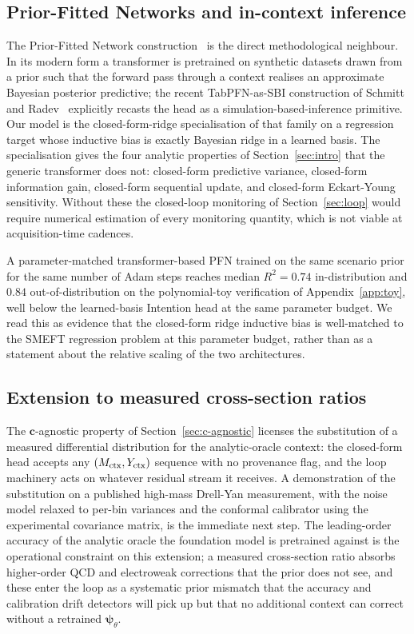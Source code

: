\documentclass[11pt,a4paper]{article}
\newcommand{\psib}{\bm{\psi}}
\begin{document}
\subsection{Prior-Fitted Networks and in-context inference}

The Prior-Fitted Network construction~\cite{Mueller:2022pfn,Schmitt:2025tabpfnsbi} is the direct methodological neighbour. In its modern form a transformer is pretrained on synthetic datasets drawn from a prior such that the forward pass through a context realises an approximate Bayesian posterior predictive; the recent TabPFN-as-SBI construction of Schmitt and Radev~\cite{Schmitt:2025tabpfnsbi} explicitly recasts the head as a simulation-based-inference primitive. Our model is the closed-form-ridge specialisation of that family on a regression target whose inductive bias is exactly Bayesian ridge in a learned basis. The specialisation gives the four analytic properties of Section~\ref{sec:intro} that the generic transformer does not: closed-form predictive variance, closed-form information gain, closed-form sequential update, and closed-form Eckart-Young sensitivity. Without these the closed-loop monitoring of Section~\ref{sec:loop} would require numerical estimation of every monitoring quantity, which is not viable at acquisition-time cadences.

A parameter-matched transformer-based PFN trained on the same scenario prior for the same number of Adam steps reaches median $R^2 = 0.74$ in-distribution and $0.84$ out-of-distribution on the polynomial-toy verification of Appendix~\ref{app:toy}, well below the learned-basis Intention head at the same parameter budget. We read this as evidence that the closed-form ridge inductive bias is well-matched to the SMEFT regression problem at this parameter budget, rather than as a statement about the relative scaling of the two architectures.

\subsection{Extension to measured cross-section ratios}
\label{sec:measured}

The $\bm{c}$-agnostic property of Section~\ref{sec:c-agnostic} licenses the substitution of a measured differential distribution for the analytic-oracle context: the closed-form head accepts any $(M_{\rm ctx}, Y_{\rm ctx})$ sequence with no provenance flag, and the loop machinery acts on whatever residual stream it receives. A demonstration of the substitution on a published high-mass Drell-Yan measurement, with the noise model relaxed to per-bin variances and the conformal calibrator using the experimental covariance matrix, is the immediate next step. The leading-order accuracy of the analytic oracle the foundation model is pretrained against is the operational constraint on this extension; a measured cross-section ratio absorbs higher-order QCD and electroweak corrections that the prior does not see, and these enter the loop as a systematic prior mismatch that the accuracy and calibration drift detectors will pick up but that no additional context can correct without a retrained $\psib_\theta$.
\end{document}
